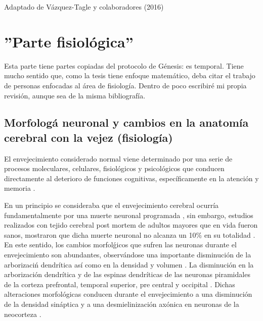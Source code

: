 \documentclass[12pt,a4paper]{mitthesis}
\begin{document}
Adaptado de V\'azquez-Tagle y colaboradores (2016)



\chapter{''Parte fisiol\'ogica''}

Esta parte tiene partes copiadas del protocolo de G\'enesis: es temporal. Tiene mucho sentido
que, como la tesis tiene enfoque matem\'atico, deba citar el trabajo de personas enfocadas al
\'area de fisiolog\'ia. Dentro de poco escribir\'e mi propia revisi\'on, aunque sea de la misma
bibliograf\'ia.

\section{Morfolog\'a neuronal y cambios en la anatomía cerebral con la vejez (fisiolog\'ia)}

El envejecimiento considerado normal viene determinado por una serie de procesos moleculares, 
celulares, fisiol\'ogicos y psicol\'ogicos que conducen directamente al deterioro de funciones 
cognitivas, específicamente en la atenci\'on y memoria \cite{Navarrete03,Park09}.

En un principio se consideraba que el envejecimiento cerebral ocurr\'ia fundamentalmente por una 
muerte neuronal programada \cite{Coleman87}, sin embargo, estudios realizados con tejido cerebral 
post mortem de adultos mayores que en vida fueron sanos, mostraron que dicha muerte neuronal no 
alcanza un 10\% en su totalidad \cite{Esiri07}. En este sentido, los cambios morfol\'gicos que 
sufren las neuronas durante el envejecimiento son abundantes, observ\'andose una importante 
disminuci\'on de la arborizaci\'n dendr\'itica as\'i como en la densidad y volumen \cite{Hita14}. 
La disminución en la arborización dendr\'itica y de las espinas dendr\'iticas de las neuronas 
piramidales de la corteza prefrontal, temporal superior, pre central y occipital \cite{Hita14}. 
Dichas alteraciones morfol\'ogicas conducen durante el envejecimiento a una disminuci\'on de 
la densidad sin\'aptica y a una desmielinizaci\'on ax\'onica en neuronas de la 
neocorteza \cite{Terry}.
\end{document}

